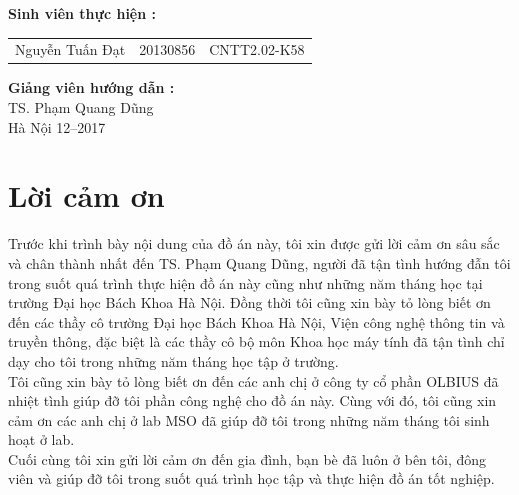 \documentclass[a4paper,12pt]{report}
\renewcommand{\contentsname}{Mục lục}
\begin{document}
\begin{center}
\hspace{-6cm}\fontsize{14}{16}\selectfont \textbf{Sinh viên thực hiện :}\\[0.1cm] 
\begin{longtable}{l c c}
Nguyễn Tuấn Đạt & 20130856 & CNTT2.02-K58 
\end{longtable}
\vspace{0.3cm}
\hspace{-6cm}\fontsize{14}{16}\selectfont \textbf{Giảng viên hướng dẫn :}\\[0.1cm]
\hspace{-2.7cm}\fontsize{14}{16}\selectfont TS. Phạm Quang Dũng \\[3cm]
\fontsize{16}{19}\selectfont Hà Nội 12--2017
\end{center}
\chapter*{Lời cảm ơn}
Trước khi trình bày nội dung của đồ án này, tôi xin được gửi lời cảm ơn sâu sắc và chân thành nhất đến TS. Phạm Quang Dũng, người đã tận tình hướng đẫn tôi trong suốt quá trình thực hiện đồ án này cũng như những năm tháng học tại trường Đại học Bách Khoa Hà Nội. Đồng thời tôi cũng xin bày tỏ lòng biết ơn đến các thầy cô trường Đại học Bách Khoa Hà Nội, Viện công nghệ thông tin và truyền thông, đặc biệt là các thầy cô bộ môn Khoa học máy tính đã tận tình chỉ dạy cho tôi trong những năm tháng học tập ở trường. \\ 

Tôi cũng xin bày tỏ lòng biết ơn đến các anh chị ở công ty cổ phần OLBIUS đã nhiệt tình giúp đỡ tôi phần công nghệ cho đồ án này. Cùng với đó, tôi cũng xin cảm ơn các anh chị ở lab MSO đã giúp đỡ tôi trong những năm tháng tôi sinh hoạt ở lab.\\

Cuối cùng tôi xin gửi lời cảm ơn đến gia đình, bạn bè đã luôn ở bên tôi, đông viên và giúp đỡ tôi trong suốt quá trình học tập và thực hiện đồ án tốt nghiệp. 
\newpage
\pdfbookmark{\contentsname}{toc}

\tableofcontents
\newpage
{}
\end{document}
